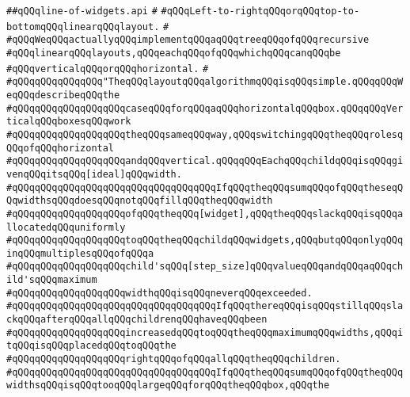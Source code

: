 \label{src/lib/x-kit/widget/old/layout/line-of-widgets.api}
\verb|##qQQqline-of-widgets.api|\newline
\verb|#|\newline
\verb|#qQQqLeft-to-rightqQQqorqQQqtop-to-bottomqQQqlinearqQQqlayout.|\newline
\verb|#|\newline
\verb|#qQQqWeqQQqactuallyqQQqimplementqQQqaqQQqtreeqQQqofqQQqrecursive|\newline
\verb|#qQQqlinearqQQqlayouts,qQQqeachqQQqofqQQqwhichqQQqcanqQQqbe|\newline
\verb|#qQQqverticalqQQqorqQQqhorizontal.|\newline
\verb|#|\newline
\verb|#qQQqqQQqqQQqqQQq"TheqQQqlayoutqQQqalgorithmqQQqisqQQqsimple.qQQqqQQqWeqQQqdescribeqQQqthe|\newline
\verb|#qQQqqQQqqQQqqQQqqQQqcaseqQQqforqQQqaqQQqhorizontalqQQqbox.qQQqqQQqVerticalqQQqboxesqQQqwork|\newline
\verb|#qQQqqQQqqQQqqQQqqQQqtheqQQqsameqQQqway,qQQqswitchingqQQqtheqQQqrolesqQQqofqQQqhorizontal|\newline
\verb|#qQQqqQQqqQQqqQQqqQQqandqQQqvertical.qQQqqQQqEachqQQqchildqQQqisqQQqgivenqQQqitsqQQq[ideal]qQQqwidth.|\newline
\verb|#qQQqqQQqqQQqqQQqqQQqqQQqqQQqqQQqqQQqIfqQQqtheqQQqsumqQQqofqQQqtheseqQQqwidthsqQQqdoesqQQqnotqQQqfillqQQqtheqQQqwidth|\newline
\verb|#qQQqqQQqqQQqqQQqqQQqofqQQqtheqQQq[widget],qQQqtheqQQqslackqQQqisqQQqallocatedqQQquniformly|\newline
\verb|#qQQqqQQqqQQqqQQqqQQqtoqQQqtheqQQqchildqQQqwidgets,qQQqbutqQQqonlyqQQqinqQQqmultiplesqQQqofqQQqa|\newline
\verb|#qQQqqQQqqQQqqQQqqQQqchild'sqQQq[step_size]qQQqvalueqQQqandqQQqaqQQqchild'sqQQqmaximum|\newline
\verb|#qQQqqQQqqQQqqQQqqQQqwidthqQQqisqQQqneverqQQqexceeded.|\newline
\verb|#qQQqqQQqqQQqqQQqqQQqqQQqqQQqqQQqqQQqIfqQQqthereqQQqisqQQqstillqQQqslackqQQqafterqQQqallqQQqchildrenqQQqhaveqQQqbeen|\newline
\verb|#qQQqqQQqqQQqqQQqqQQqincreasedqQQqtoqQQqtheqQQqmaximumqQQqwidths,qQQqitqQQqisqQQqplacedqQQqtoqQQqthe|\newline
\verb|#qQQqqQQqqQQqqQQqqQQqrightqQQqofqQQqallqQQqtheqQQqchildren.|\newline
\verb|#qQQqqQQqqQQqqQQqqQQqqQQqqQQqqQQqqQQqIfqQQqtheqQQqsumqQQqofqQQqtheqQQqwidthsqQQqisqQQqtooqQQqlargeqQQqforqQQqtheqQQqbox,qQQqthe|\newline
